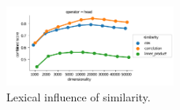 \begin{figure}[h]
  \centering

  \includegraphics[width=0.5\textwidth]{supplement/figures/lexical-interaction-similarity}

  \caption{Lexical influence of similarity.}
  \label{fig:lexical-similarity}
\end{figure}
